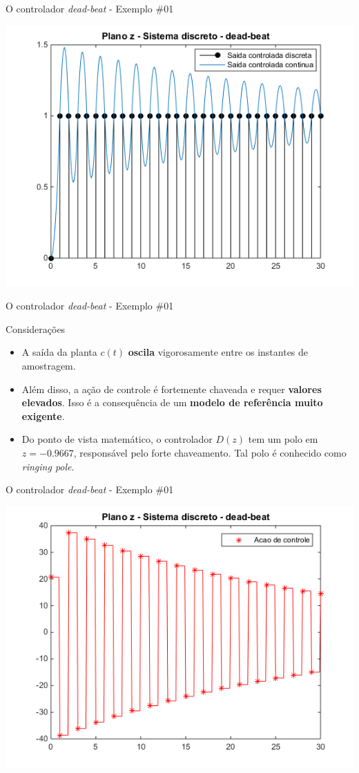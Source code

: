 \begin{frame}{O controlador \textit{dead-beat} - Exemplo \#01}
\centerline{\includegraphics[width=0.8\linewidth]{Figuras/Ch12/fig5.png}}
\end{frame}

\begin{frame}{O controlador \textit{dead-beat} - Exemplo \#01}
\begin{block}{Considerações}
\begin{itemize}
    \item A saída da planta $c(t)$ \textbf{oscila} vigorosamente entre os instantes de amostragem.
    \item Além disso, a ação de controle é fortemente chaveada e requer \textbf{valores elevados}. Isso é a consequência de um \textbf{modelo de referência muito exigente}.
    \item Do ponto de vista matemático, o controlador $D(z)$ tem um polo em $z = -\num{0,9667}$, responsável pelo forte chaveamento. Tal polo é conhecido como \textit{ringing pole}. 
\end{itemize}
\end{block}
\end{frame}

\begin{frame}{O controlador \textit{dead-beat} - Exemplo \#01}
\centerline{\includegraphics[width=0.8\linewidth]{Figuras/Ch12/fig6.png}}
\end{frame}


